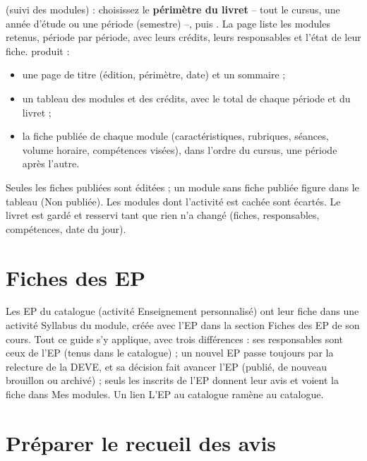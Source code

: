 \documentclass[11pt,a4paper]{article}
\begin{document}
 (suivi des modules) : choisissez le \textbf{périmètre du livret} --
tout le cursus, une année d'étude ou une période (semestre) --, puis . La page liste les
modules retenus, période par période, avec leurs crédits, leurs responsables et l'état de leur
fiche.  produit :
\begin{itemize}
  \item une page de titre (édition, périmètre, date) et un sommaire ;
  \item un tableau des modules et des crédits, avec le total de chaque période et du livret ;
  \item la fiche publiée de chaque module (caractéristiques, rubriques, séances, volume horaire,
    compétences visées), dans l'ordre du cursus, une période après l'autre.
\end{itemize}
Seules les fiches publiées sont éditées ; un module sans fiche publiée figure dans le tableau
(\og Non publiée\fg{}). Les modules dont l'activité est cachée sont écartés. Le livret est gardé
et resservi tant que rien n'a changé (fiches, responsables, compétences, date du jour).



\section{Fiches des EP}

Les EP du catalogue (activité \og Enseignement personnalisé\fg{}) ont leur fiche dans une
activité \og Syllabus du module\fg{}, créée avec l'EP dans la section \og Fiches des EP\fg{} de
son cours. Tout ce guide s'y applique, avec trois différences : ses responsables sont ceux de
l'EP (tenus dans le catalogue) ; un nouvel EP passe toujours par la relecture de la DEVE, et sa
décision fait avancer l'EP (publié, de nouveau brouillon ou archivé) ; seuls les inscrits de
l'EP donnent leur avis et voient la fiche dans \og Mes modules\fg{}. Un lien \og L'EP au
catalogue\fg{} ramène au catalogue.

\section{Préparer le recueil des avis}
\end{document}
